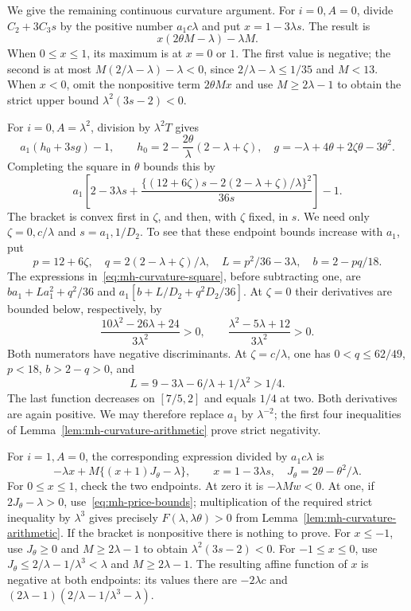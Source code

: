 We give the remaining continuous curvature argument. For $i=0,A=0$, divide $C_2+3C_3s$ by the positive number $a_1c\lambda$ and put $x=1-3\lambda s$. The result is
\[
 x(2\theta M-\lambda)-\lambda M.
\]
When $0\le x\le1$, its maximum is at $x=0$ or $1$. The first value is negative; the second is at most $M(2/\lambda-\lambda)-\lambda<0$, since $2/\lambda-\lambda\le1/35$ and $M<13$. When $x<0$, omit the nonpositive term $2\theta Mx$ and use $M\ge2\lambda-1$ to obtain the strict upper bound $\lambda^2(3s-2)<0$.

For $i=0,A=\lambda^2$, division by $\lambda^2T$ gives
\[
 a_1(h_0+3sg)-1,\qquad
 h_0=2-\frac{2\theta}{\lambda}(2-\lambda+\zeta),\quad
 g=-\lambda+4\theta+2\zeta\theta-3\theta^2.
\]
Completing the square in $\theta$ bounds this by
\begin{equation}\label{eq:mh-curvature-square}
 a_1\left[2-3\lambda s+
 \frac{\{(12+6\zeta)s-2(2-\lambda+\zeta)/\lambda\}^2}{36s}\right]-1.
\end{equation}
The bracket is convex first in $\zeta$, and then, with $\zeta$ fixed, in $s$. We need only $\zeta=0,c/\lambda$ and $s=a_1,1/D_2$. To see that these endpoint bounds increase with $a_1$, put
\[
 p=12+6\zeta,\quad q=2(2-\lambda+\zeta)/\lambda,\quad
 L=p^2/36-3\lambda,\quad b=2-pq/18.
\]
The expressions in~\eqref{eq:mh-curvature-square}, before subtracting one, are
$ba_1+La_1^2+q^2/36$ and
$a_1[b+L/D_2+q^2D_2/36]$. At $\zeta=0$ their derivatives are bounded below, respectively, by
\[
 \frac{10\lambda^2-26\lambda+24}{3\lambda^2}>0,
 \qquad\frac{\lambda^2-5\lambda+12}{3\lambda^2}>0.
\]
Both numerators have negative discriminants. At $\zeta=c/\lambda$, one has $0<q\le62/49$, $p<18$, $b>2-q>0$, and
\[
 L=9-3\lambda-6/\lambda+1/\lambda^2>1/4.
\]
The last function decreases on $[7/5,2]$ and equals $1/4$ at two. Both derivatives are again positive. We may therefore replace $a_1$ by $\lambda^{-2}$; the first four inequalities of Lemma~\ref{lem:mh-curvature-arithmetic} prove strict negativity.

For $i=1,A=0$, the corresponding expression divided by $a_1c\lambda$ is
\[
 -\lambda x+M\{(x+1)J_\theta-\lambda\},\qquad
 x=1-3\lambda s,\quad J_\theta=2\theta-\theta^2/\lambda.
\]
For $0\le x\le1$, check the two endpoints. At zero it is $-\lambda Mw<0$. At one, if $2J_\theta-\lambda>0$, use~\eqref{eq:mh-price-bounds}; multiplication of the required strict inequality by $\lambda^3$ gives precisely $F(\lambda,\lambda\theta)>0$ from Lemma~\ref{lem:mh-curvature-arithmetic}. If the bracket is nonpositive there is nothing to prove. For $x\le-1$, use $J_\theta\ge0$ and $M\ge2\lambda-1$ to obtain $\lambda^2(3s-2)<0$. For $-1\le x\le0$, use $J_\theta\le2/\lambda-1/\lambda^3<\lambda$ and $M\ge2\lambda-1$. The resulting affine function of $x$ is negative at both endpoints: its values there are $-2\lambda c$ and $(2\lambda-1)(2/\lambda-1/\lambda^3-\lambda)$.

